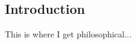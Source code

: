 \chapter{\chapxname}
\label{chapter10}


\section{Introduction}
This is where I get philosophical...
